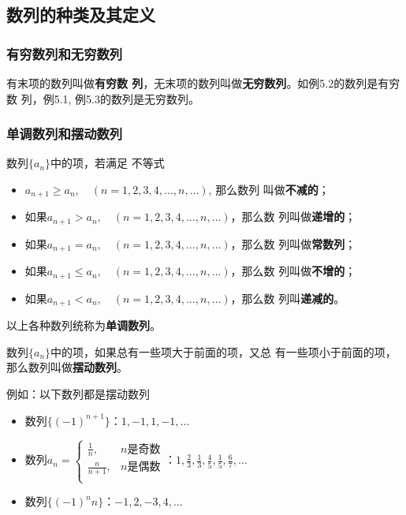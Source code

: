 \subsection{数列的种类及其定义}
\subsubsection{有穷数列和无穷数列}

有末项的数列叫做\textbf{有穷数
列}，无末项的数列叫做\textbf{无穷数列}。如例5.2的数列是有穷数
列，例5.1, 例5.3的数列是无穷数列。


\subsubsection{单调数列和摆动数列}

数列$\{a_n\}$中的项，若满足
不等式
\begin{itemize}
    \item $a_{n+1}\ge a_n,\quad (n=1,2,3,4,\ldots,n,\ldots)$, 那么数列
叫做\textbf{不减的}； 
\item 如果$a_{n+1}> a_n,\quad (n=1,2,3,4,\ldots,n,\ldots)$，那么数
列叫做\textbf{递增的}；
\item 如果$a_{n+1}= a_n,\quad (n=1,2,3,4,\ldots,n,\ldots)$，那么数
列叫做\textbf{常数列}；
\item 如果$a_{n+1}\le a_n,\quad (n=1,2,3,4,\ldots,n,\ldots)$，那么数
列叫做\textbf{不增的}；
\item 如果$a_{n+1}< a_n,\quad (n=1,2,3,4,\ldots,n,\ldots)$，那么数
列叫\textbf{递减的}。
\end{itemize}

以上各种数列统称为\textbf{单调数列}。

数列$\{a_n\}$中的项，如果总有一些项大于前面的项，又总
有一些项小于前面的项，那么数列叫做\textbf{摆动数列}。

例如：以下数列都是摆动数列
\begin{itemize}
    \item 数列$\{(-1)^{n+1}\}$：$1,-1,1,-1,\ldots$
    \item 数列$a_n=\begin{cases}
        \frac{1}{n}, & \text{$n$是奇数}\\
        \frac{n}{n+1}, & \text{$n$是偶数}\\
    \end{cases}$：$1,\frac{2}{3},\frac{1}{3},\frac{4}{5},\frac{1}{5},\frac{6}{7},\ldots$
    \item 数列$\{(-1)^{n}n\}$：$-1,2,-3,4,\ldots$
\end{itemize}

